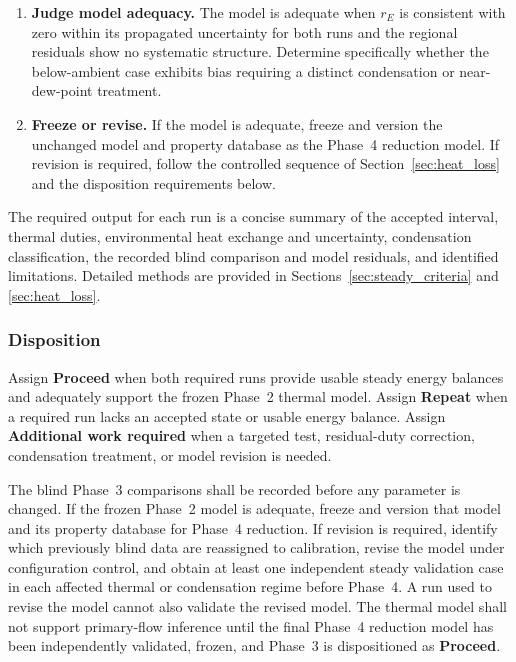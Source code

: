 \documentclass[11pt]{article}
\begin{document}
\begin{enumerate}
    \item \textbf{Judge model adequacy.} The model is adequate when $r_E$ is consistent with zero within its propagated uncertainty for both runs and the regional residuals show no systematic structure. Determine specifically whether the below-ambient case exhibits bias requiring a distinct condensation or near-dew-point treatment.

    \item \textbf{Freeze or revise.} If the model is adequate, freeze and version the unchanged model and property database as the Phase~4 reduction model. If revision is required, follow the controlled sequence of Section~\ref{sec:heat_loss} and the disposition requirements below.
\end{enumerate}

The required output for each run is a concise summary of the accepted interval, thermal duties, environmental heat exchange and uncertainty, condensation classification, the recorded blind comparison and model residuals, and identified limitations. Detailed methods are provided in Sections~\ref{sec:steady_criteria} and \ref{sec:heat_loss}.


\subsubsection{Disposition}

Assign \textbf{Proceed} when both required runs provide usable steady energy balances and adequately support the frozen Phase~2 thermal model. Assign \textbf{Repeat} when a required run lacks an accepted state or usable energy balance. Assign \textbf{Additional work required} when a targeted test, residual-duty correction, condensation treatment, or model revision is needed.

The blind Phase~3 comparisons shall be recorded before any parameter is changed. If the frozen Phase~2 model is adequate, freeze and version that model and its property database for Phase~4 reduction. If revision is required, identify which previously blind data are reassigned to calibration, revise the model under configuration control, and obtain at least one independent steady validation case in each affected thermal or condensation regime before Phase~4. A run used to revise the model cannot also validate the revised model. The thermal model shall not support primary-flow inference until the final Phase~4 reduction model has been independently validated, frozen, and Phase~3 is dispositioned as \textbf{Proceed}.
\end{document}
